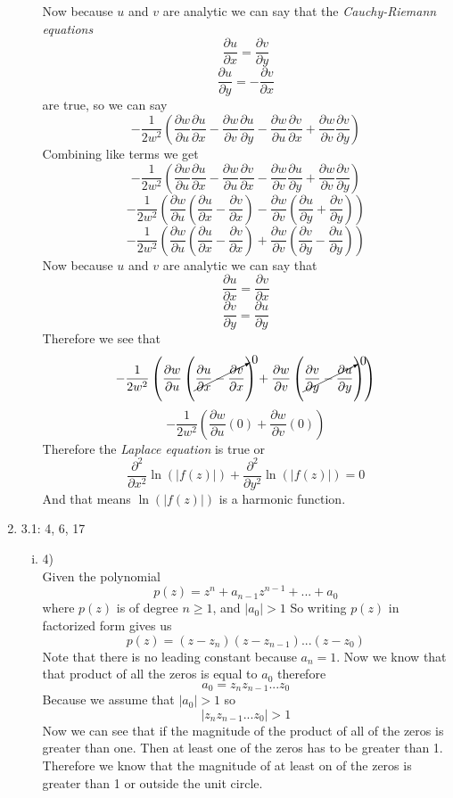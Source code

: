 \documentclass[11pt]{article}
\begin{document}
\begin{enumerate}
\begin{enumerate}[(i)]
Now because $u$ and $v$ are analytic we can say that the \emph{Cauchy-Riemann equations}
$$\frac{\partial u}{\partial x}=\frac{\partial v}{\partial y}$$
$$\frac{\partial u}{\partial y}=-\frac{\partial v}{\partial x}$$
are true, so we can say
$$-\frac{1}{2w^2}\left(\frac{\partial w}{\partial u}\frac{\partial u}{\partial x} -\frac{\partial w}{\partial v}\frac{\partial u}{\partial y}-\frac{\partial w}{\partial u}\frac{\partial v}{\partial x} +\frac{\partial w}{\partial v}\frac{\partial v}{\partial y}\right)$$
Combining like terms we get
$$-\frac{1}{2w^2}\left(\frac{\partial w}{\partial u}\frac{\partial u}{\partial x} -\frac{\partial w}{\partial u}\frac{\partial v}{\partial x}-\frac{\partial w}{\partial v}\frac{\partial u}{\partial y} +\frac{\partial w}{\partial v}\frac{\partial v}{\partial y}\right)$$
$$-\frac{1}{2w^2}\left(\frac{\partial w}{\partial u}\left(\frac{\partial u}{\partial x} -\frac{\partial v}{\partial x}\right)-\frac{\partial w}{\partial v}\left(\frac{\partial u}{\partial y} +\frac{\partial v}{\partial y}\right)\right)$$
$$-\frac{1}{2w^2}\left(\frac{\partial w}{\partial u}\left(\frac{\partial u}{\partial x} -\frac{\partial v}{\partial x}\right)+\frac{\partial w}{\partial v}\left(\frac{\partial v}{\partial y}- \frac{\partial u}{\partial y}\right)\right)$$
Now because $u$ and $v$ are analytic we can say that
$$\frac{\partial u}{\partial x} = \frac{\partial v}{\partial x}$$
$$\frac{\partial v}{\partial y} = \frac{\partial u}{\partial y}$$
Therefore we see that 
$$-\frac{1}{2w^2}\left(\frac{\partial w}{\partial u}\left(\cancelto{0}{\frac{\partial u}{\partial x} -\frac{\partial v}{\partial x}}\right)+\frac{\partial w}{\partial v}\left(\cancelto{0}{\frac{\partial v}{\partial y}- \frac{\partial u}{\partial y}}\right)\right)$$
$$-\frac{1}{2w^2}\left(\frac{\partial w}{\partial u}(0)+\frac{\partial w}{\partial v}(0)\right)$$
Therefore the \emph{Laplace equation} is true or 
$$\frac{\partial^2}{\partial x^2}\ln(|f(z)|)+\frac{\partial^2}{\partial y^2}\ln(|f(z)|)=0$$
And that means $\ln(|f(z)|)$ is a harmonic function.

\end{enumerate}
\item 3.1: 4, 6, 17
\begin{enumerate}[(i)]
\item 4)\\
Given the polynomial 
$$p(z) = z^n+a_{n-1}z^{n-1}+...+a_0$$
where $p(z)$ is of degree $n \ge 1$, and $|a_0|>1$
So writing $p(z)$ in factorized form gives us
$$p(z) = (z-z_n)(z-z_{n-1})...(z-z_0)$$
Note that there is no leading constant because $a_n = 1$. Now we know that that product of all the zeros is equal to $a_0$ therefore
$$a_0 = z_n z_{n-1} ...z_0$$
Because we assume that $|a_0|>1$ so
$$|z_n z_{n-1} ...z_0|>1$$
Now we can see that if the magnitude of the product of all of the zeros is greater than one. Then at least one of the zeros has to be greater than 1. Therefore we know that the magnitude of at least on of the zeros is greater than 1 or outside the unit circle.


\end{enumerate}
\end{enumerate}
\end{document}
